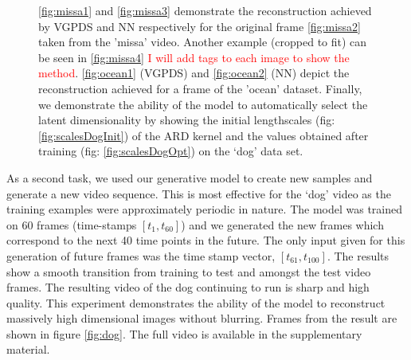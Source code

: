 \documentclass{article} %
\begin{document}
\begin{figure}[ht]
\begin{center}
{}
\end{center}
\caption{\small{
\ref{fig:missa1} and \ref{fig:missa3} demonstrate the reconstruction achieved by VGPDS and NN respectively for the original frame \ref{fig:missa2} taken from the 'missa' video. Another example (cropped to fit) can be seen in \ref{fig:missa4} \textcolor{red}{I will add tags to each image to show the method}. \ref{fig:ocean1} (VGPDS) and \ref{fig:ocean2} (NN) depict the reconstruction achieved for a frame of the 'ocean' dataset. 
Finally, we demonstrate the ability of the model to automatically select the latent dimensionality by showing the initial lengthscales (fig: \ref{fig:scalesDogInit}) of the ARD kernel and the values obtained after training (fig: \ref{fig:scalesDogOpt}) on the `dog' data set. 
}
}
\label{fig:video1}
\end{figure}

\par As a second task, we used our generative model to create new
samples and generate a new video sequence. This is most effective for
the `dog' video as the training examples were approximately periodic
in nature. The model was trained on 60 frames (time-stamps $[t_1,
t_{60}]$) and we generated the new frames which correspond to the next
40 time points in the future. The only input given for this generation
of future frames was the time stamp vector, $[t_{61}, t_{100}]$. The
results show a smooth transition from training to test and amongst the
test video frames. The resulting video of the dog continuing to run is
sharp and high quality. This experiment demonstrates the ability of
the model to reconstruct massively high dimensional images without
blurring. Frames from the result are shown in figure
\ref{fig:dog}. The full video is available in the supplementary
material.
\end{document}
